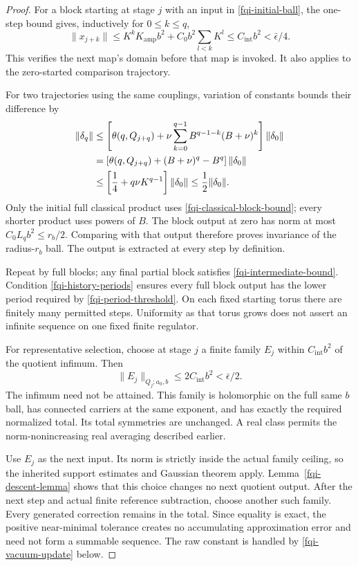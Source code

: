 \begin{proof}
For a block starting at stage $j$ with an input in
\eqref{fqi-initial-ball}, the one-step bound gives, inductively
for $0\le k\le q$,
\begin{equation}
 \|x_{j+k}\|
 \le K^kK_{\mathrm{amp}}b^2+C_0b^2\sum_{l<k}K^l
 \le C_{\mathrm{int}}b^2<\bar\epsilon/4.
 \label{fqi-intermediate-bound}
\end{equation}
This verifies the next map's domain before that map is invoked.
It also applies to the zero-started comparison trajectory.

For two trajectories using the same couplings, variation of
constants bounds their difference by
\begin{align}
 \|\delta_q\|
 &\le\left[\theta(q,Q_{j+q})
       +\nu\sum_{k=0}^{q-1}B^{q-1-k}(B+\nu)^k\right]
                                             \|\delta_0\|\notag\\
 &=\left[\theta(q,Q_{j+q})+(B+\nu)^q-B^q\right]
                                             \|\delta_0\|\notag\\
 &\le\left[\frac14+q\nu K^{q-1}\right]\|\delta_0\|
 \le\frac12\|\delta_0\|.
 \label{fqi-Duhamel}
\end{align}
Only the initial full classical product uses
\eqref{fqi-classical-block-bound}; every shorter product
uses powers of $B$. The block output at zero has norm at
most $C_0L_qb^2\le r_b/2$. Comparing with that output
therefore proves invariance of the radius-$r_b$ ball.
The output is extracted at every step by definition.

Repeat by full blocks; any final partial block satisfies
\eqref{fqi-intermediate-bound}. Condition
\eqref{fqi-history-periods} ensures every full block output
has the lower period required by
\eqref{fqi-period-threshold}. On each fixed starting torus
there are finitely many permitted steps. Uniformity as that
torus grows does not assert an infinite sequence on one
fixed finite regulator.

For representative selection, choose at stage $j$ a finite
family $E_j$ within $C_{\mathrm{int}}b^2$ of the quotient infimum.
Then
\begin{equation}
 \|E_j\|_{Q_j;a_0,b}
        \le2C_{\mathrm{int}}b^2<\bar\epsilon/2.
 \label{fqi-chosen-family}
\end{equation}
The infimum need not be attained. This family is holomorphic
on the full same $b$ ball, has connected carriers at the
same exponent, and has exactly the required normalized total.
Its total symmetries are unchanged. A real class permits the
norm-nonincreasing real averaging described earlier.

Use $E_j$ as the next input. Its norm is strictly inside the
actual family ceiling, so the inherited support estimates
and Gaussian theorem apply. Lemma~\ref{fqi-descent-lemma}
shows that this choice changes no next quotient output.
After the next step and actual finite reference subtraction,
choose another such family. Every generated correction remains
in the total. Since equality is exact, the positive
near-minimal tolerance creates no accumulating approximation
error and need not form a summable sequence. The raw constant
is handled by \eqref{fqi-vacuum-update} below.
\end{proof}

